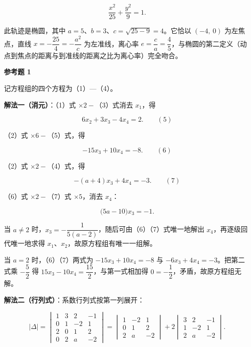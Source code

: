 \begin{answer}
\nopagebreak[4]
\[
\frac{x^2}{25}+\frac{y^2}{9}=1.
\]

此轨迹是椭圆，其中 $a=5$、$b=3$、$c=\sqrt{25-9}=4$。它恰以 $(-4,\ 0)$ 为左焦点，直线 $x=-\dfrac{25}{4}=-\dfrac{a^2}{c}$ 为左准线，离心率 $e=\dfrac{c}{a}=\dfrac{4}{5}$，与椭圆的第二定义（动点到焦点的距离与到准线的距离之比为离心率）完全吻合。

\textbf{参考题 1}

记方程组的四个方程为（1）—（4）。

\textbf{解法一（消元）}：（1）式 $\times 2-$（3）式消去 $x_1$，得

\nopagebreak[4]
\[
6x_2+3x_3-4x_4=2.
\qquad(5)
\]

（2）式 $\times 6-$（5）式，得

\nopagebreak[4]
\[
-15x_3+10x_4=-8.
\qquad(6)
\]

（2）式 $\times 2-$（4）式，得

\nopagebreak[4]
\[
-(a+4)x_3+4x_4=-3.
\qquad(7)
\]

（6）式 $\times 2-$（7）式 $\times 5$，消去 $x_4$：

\nopagebreak[4]
\[
\bigl(5a-10\bigr)x_3=-1.
\]

当 $a\neq 2$ 时，$x_3=-\dfrac{1}{5(a-2)}$，随后可由（6）（7）式唯一地解出 $x_4$，再逐级回代唯一地求得 $x_1\text{、}x_2$，故原方程组有唯一一组解。

当 $a=2$ 时，（6）（7）两式为 $-15x_3+10x_4=-8$ 与 $-6x_3+4x_4=-3$。把第二式乘 $-\dfrac{5}{2}$ 得 $15x_3-10x_4=\dfrac{15}{2}$，与第一式相加得 $0=-\dfrac{1}{2}$，矛盾，故原方程组无解。

\textbf{解法二（行列式）}：系数行列式按第一列展开：

\nopagebreak[4]
\[
|\Delta|=
\begin{vmatrix}
1 & 3 & 2 & -1\\
0 & 1 & -2 & 1\\
2 & 0 & 1 & 2\\
0 & 2 & a & -2
\end{vmatrix}
=
\begin{vmatrix}
1 & -2 & 1\\
0 & 1 & 2\\
2 & a & -2
\end{vmatrix}
+2\begin{vmatrix}
3 & 2 & -1\\
1 & -2 & 1\\
2 & a & -2
\end{vmatrix}.
\]


\end{answer}
